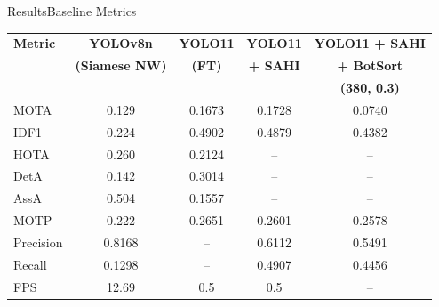 \documentclass[10pt]{beamer}
\begin{document}
	\begin{frame}{Results}{Baseline Metrics}
		\footnotesize
		
		\begin{table}
			\centering
			\setlength{\tabcolsep}{5pt}
			\begin{tabular}{lcccc}
				\toprule
				\textbf{Metric} & \textbf{YOLOv8n} & \textbf{YOLO11} & \textbf{YOLO11} & \textbf{YOLO11 + SAHI} \\
				& \textbf{(Siamese NW)} & \textbf{(FT)}   & \textbf{+ SAHI} & \textbf{+ BotSort} \\
				&                       &                 &                 & \textbf{(380, 0.3)} \\
				\midrule
				MOTA      & 0.129                                 & 0.1673                  & 0.1728                  & \textcolor{bad}{0.0740}          \\
				IDF1      & 0.224                                 & \textcolor{good}{0.4902}& 0.4879                  & 0.4382                            \\
				HOTA      & \textcolor{good}{0.260}               & 0.2124                  & --                      & --                                \\
				DetA      & 0.142                                 & \textcolor{good}{0.3014}& --                      & --                                \\
				AssA      & \textcolor{good}{0.504}               & 0.1557                  & --                      & --                                \\
				MOTP      & 0.222                                 & 0.2651                  & \textcolor{good}{0.2601}& 0.2578                            \\
				Precision & \textcolor{good}{0.8168}              & --                      & 0.6112                  & 0.5491                            \\
				Recall    & 0.1298                                & --                      & 0.4907                  & \textcolor{good}{0.4456}          \\
				FPS       & \textcolor{good}{12.69}               & 0.5                     & 0.5                     & --                                \\
				\bottomrule
			\end{tabular}
		\end{table}	
	\end{frame}
	
\end{document}
